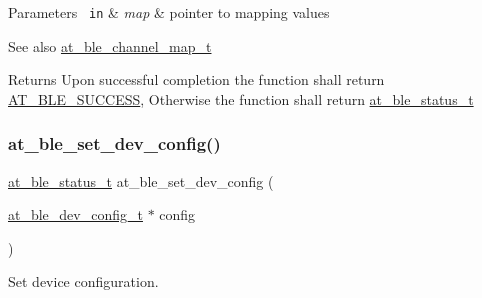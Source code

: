 \begin{DoxyParams}[1]{Parameters}
\mbox{\texttt{ in}}  & {\em map} & pointer to mapping values\\
\hline
\end{DoxyParams}
\begin{DoxySeeAlso}{See also}
\mbox{\hyperlink{structat__ble__channel__map__t}{at\+\_\+ble\+\_\+channel\+\_\+map\+\_\+t}}
\end{DoxySeeAlso}
\begin{DoxyReturn}{Returns}
Upon successful completion the function shall return \mbox{\hyperlink{group__error__codes__group_gga3b1db9b95feb157b3c188ca27fe76988a7e3bfff5387331cd4f2c56cbcbbd7e19}{A\+T\+\_\+\+B\+L\+E\+\_\+\+S\+U\+C\+C\+E\+SS}}, Otherwise the function shall return \mbox{\hyperlink{at__ble__api_8h_ace24eb4e5ca3f325c663b809da5feb92}{at\+\_\+ble\+\_\+status\+\_\+t}} 
\end{DoxyReturn}
\mbox{\label{group__gap__dev__config__group_ga6d329f50553f677f15cb89a823be9dc1}} 
\subsubsection{\texorpdfstring{at\_ble\_set\_dev\_config()}{at\_ble\_set\_dev\_config()}}
{\footnotesize\ttfamily \mbox{\hyperlink{group__error__codes__group_ga3b1db9b95feb157b3c188ca27fe76988}{at\+\_\+ble\+\_\+status\+\_\+t}} at\+\_\+ble\+\_\+set\+\_\+dev\+\_\+config (\begin{DoxyParamCaption}\item[{\mbox{\hyperlink{structat__ble__dev__config__t}{at\+\_\+ble\+\_\+dev\+\_\+config\+\_\+t}} $\ast$}]{config }\end{DoxyParamCaption})}



Set device configuration. 


